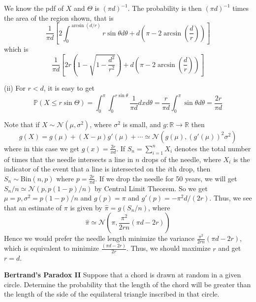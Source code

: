 We know the pdf of $X$ and $\Theta$ is $(\pi d)^{-1}$. The probability is then $(\pi d)^{-1}$ times the area of the region shown, that is 
\begin{equation}
\frac{1}{\pi d}\left[2\int^{\arcsin(d/r)}_0r\sin\theta d\theta + d\left(\pi-2\arcsin\left(\frac dr\right)\right)\right]
\end{equation}
which is 
\begin{equation}
\frac{1}{\pi d}\left[2r\left(1 - \sqrt{1-\frac{d^2}{r^2}}\right) +  d\left(\pi-2\arcsin\left(\frac dr\right)\right)\right]
\end{equation}

(ii) For $r<d$, it is easy to get 
\begin{equation}
\mathbb{P}(X\leq r\sin\Theta) = \int^\pi_0\int^{r\sin\theta}_0\frac{1}{\pi d}dxd\theta = \frac{r}{\pi d}\int^\pi_0\sin\theta d\theta = \frac{2r}{\pi d}
\end{equation}

Note that if $X\sim\mathcal{N}(\mu,\sigma^2)$, where $\sigma^2$ is small, and $g: \mathbb{R}\to\mathbb{R}$ then
\begin{equation}
g(X) = g(\mu) + (X-\mu)g'(\mu) + \cdots \simeq \mathcal{N}\left(g(\mu),(g'(\mu))^2\sigma^2\right)
\end{equation}
where in this case we get $g(x) = \frac{2r}{x d}$. If $S_n=\sum^n_{i=1}X_i$ denotes the total number of times that the needle intersects a line in $n$ drops of the needle, where $X_i$ is the indicator of the event that a line is intersected on the $i$th drop, then $S_n\sim\text{Bin}(n,p)$ where $p = \frac{2r}{\pi d}$. If we drop the needle for 50 years, we will get $S_n/n\simeq \mathcal{N}(p,p(1-p)/n)$ by Central Limit Theorem. So we get $\mu = p, \sigma^2=p(1-p)/n$ and $g(p)= \pi$ and $g'(p) = -\pi^2d/(2r)$. Thus, we see that an estimate of $\pi$ is given by $\hat{\pi} = g(S_n/n)$, where  
\begin{equation}
\hat{\pi} \simeq \mathcal{N}\left(\pi, \frac{\pi^2}{2rn}(\pi d-2r)\right)
\end{equation}
Hence we would prefer the needle length minimize the variance $\frac{\pi^2}{2rn}(\pi d-2r)$, which is equivalent to minimize $\frac{(\pi d-2r)}{2r}$. Thus, we should maximize $r$ and get $r=d$.


\item {\bf Bertrand's Paradox II} Suppose that a chord is drawn at random in a given circle. Determine the probability that the length of the chord will be greater than the length of the side of the equilateral triangle inscribed in that circle.



